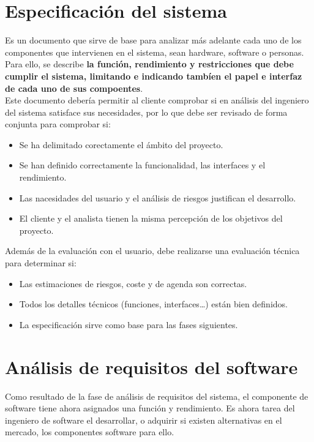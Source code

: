 \section{Especificación del sistema}

Es un documento que sirve de base para analizar más adelante cada uno de los componentes que intervienen en el sistema, sean hardware, software o personas. Para ello, se describe \textbf{la función, rendimiento y restricciones que debe cumplir el sistema, limitando e indicando tambíen el papel e interfaz de cada uno de sus compoentes}.\\

Este documento debería permitir al cliente comprobar si en análisis del ingeniero del sistema satisface sus necesidades, por lo que debe ser revisado de forma conjunta para comprobar si:

\begin{itemize}
    \item Se ha delimitado corectamente el ámbito del proyecto.
    \item Se han definido correctamente la funcionalidad, las interfaces y el rendimiento.
    \item Las nacesidades del usuario y el análisis de riesgos justifican el desarrollo.
    \item El cliente y el analista tienen la misma percepción de los objetivos del proyecto.
\end{itemize}

Además de la evaluación con el usuario, debe realizarse una evaluación técnica para determinar si:

\begin{itemize}
    \item Las estimaciones de riesgos, coste y de agenda son correctas.
    \item Todos los detalles técnicos (funciones, interfaces\ldots) están bien definidos.
    \item La especificación sirve como base para las fases siguientes.
\end{itemize}

\section{Análisis de requisitos del software}

Como resultado de la fase de análisis de requisitos del sistema, el componente de software tiene ahora asignados una función y rendimiento. Es ahora tarea del ingeniero de software el desarrollar, o adquirir si existen alternativas en el mercado, los componentes software para ello.

